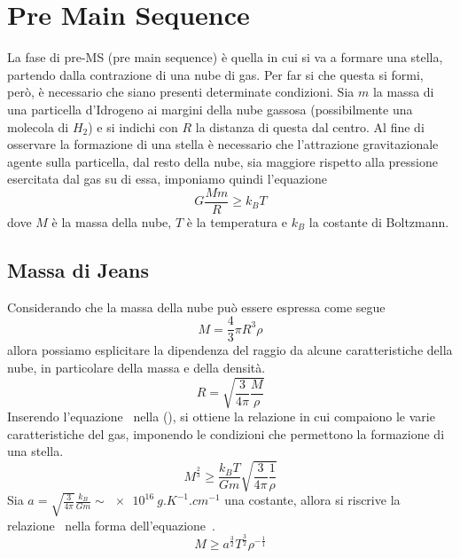 \section{Pre Main Sequence}\label{sec:pre-main-sequence}

La fase di pre-MS (pre main sequence) è quella in cui si va a formare una stella, partendo dalla contrazione di una nube di gas. Per far si che questa si formi, però, è necessario che siano presenti determinate condizioni. Sia $m$ la massa di una particella d'Idrogeno ai margini della nube gassosa (possibilmente una molecola di $H_2$) e si indichi con $R$ la distanza di questa dal centro. Al fine di osservare la formazione di una stella è necessario che l'attrazione gravitazionale agente sulla particella, dal resto della nube, sia maggiore rispetto alla pressione esercitata dal gas su di essa, imponiamo quindi l'equazione~
\begin{equation}
    G \frac{M m}{R} \geq k_B T
    \label{eq:1}
\end{equation}
dove $M$ è la massa della nube, $T$ è la temperatura e $k_B$ la costante di Boltzmann.
\subsection{Massa di Jeans}\label{sec:massa-jeans}

Considerando che la massa della nube può essere espressa come segue
\[
    M = \frac{4}{3} \pi R^3 \rho
\]
allora possiamo esplicitare la dipendenza del raggio da alcune caratteristiche della nube, in particolare della massa e della densità.
\begin{equation}
    R = \sqrt{\frac{3}{4\pi} \frac{M}{\rho}}
    \label{eq:2}
\end{equation}
Inserendo l'equazione~ nella (), si ottiene la relazione in cui compaiono le varie caratteristiche del gas, imponendo le condizioni che permettono la formazione di una stella.
\begin{equation}
    M^{\frac{2}{3}} \geq \frac{k_B T}{G m} \sqrt{\frac{3}{4\pi} \frac{1}{\rho}}
    \label{eq:3}
\end{equation}
Sia $a = \sqrt{\frac{3}{4\pi}}\frac{k_B}{G m} \sim \SI{e16}{g.K^{-1}.cm^{-1}}$ una costante, allora si riscrive la relazione~ nella forma dell'equazione~.
\begin{equation}
    M \geq a^{\frac{3}{2}} T^{\frac{3}{2}} \rho^{-\frac{1}{1}}
\label{eq:jeans}
\end{equation}

